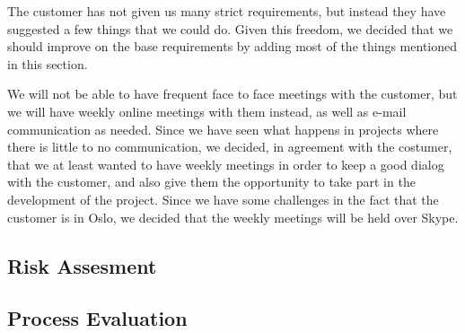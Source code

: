     The customer has not given us many strict requirements, but instead they have suggested a few things that we could do. Given this freedom, we decided that we should improve on the base requirements by adding most of the things mentioned in this section.
    
    We will not be able to have frequent face to face meetings with the customer, but we will have weekly online meetings with them instead, as well as e-mail communication as needed. Since we have seen what happens in projects where there is little to no communication, we decided, in agreement with the costumer, that we at least wanted to have weekly meetings in order to keep a good dialog with the customer, and also give them the opportunity to take part in the development of the project. Since we have some challenges in the fact that the customer is in Oslo, we decided that the weekly meetings will be held over Skype.
    
    \subsection{Risk Assesment}\label{risk}
    
    \subsection{Process Evaluation}\label{processevaluation}
    

